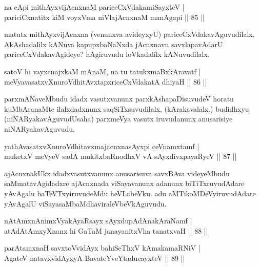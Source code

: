 \begin{shl}
na cApi mithAyxvijAcnxnaM pariceCxVdakamiSayxteV |\\
pariciCxnatitx kiM voyxVma niVlajAcnxnaM manAgapi \hfill || 85 ||
\end{shl}

\begin{artha}
matutx mithAyxvijAcnxna (venunxva avideyxyU) pariceCxVdakavAguvudilalx, AkAshadalilx 
kANuva kapupxbaNaNxda jAcnxnavu savxlapavAdarU pariceCxVdakavAgideye? hAgiruvudu loVkadalilx 
kANuvudilalx.
\end{artha}

\begin{shl}
satoV hi vayxcnajxkaM mAnaM, na tu tatukxmaBxkAravatf |\\
meVyavasatxvXnuroVdhitAvxtapxriceCxVdakatA dhiyaH \hfill || 86 ||
\end{shl}

\begin{artha}
parxmANaveMbudu idadx vasutxvanunx parxkAshapaDisuvudeV horatu kuMbAranaMte ilalxdadxnunx 
saqSiTxsuvudilalx, (kArakavalalx.) budidhxyu (niNARyakavAguvudUsaha) parxmeVya vasutx 
iruvudanunx anusarisiye niNARyakavAguvudu.
\end{artha}

\begin{shl}
yathAvasatxvXnuroVdhitavxmajacnxnasAyxpi ceVnamxtamf |\\
muketxV meVyeV sadA mukitxbaRnodhxV vA sAyxdivxpayaRyeV \hfill || 87 ||
\end{shl}

\begin{artha}
ajAcnxnakUkx idadxvasutxvanunx anusarisuva savxBAva videyeMbudu saMmatavAgidadxre ajAcnxnada viSayavanunx adanunx biTiTxruvudAdare yAvAgalu baTeVTxyiruvudeMdu heVLabeVku. adu aMTikoMDeVyiruvudAdare yAvAgalU viSayasaMbaMdhaviraleVbeVkAguvudu.
\end{artha}


\begin{shl}
nA\s \s tAmx\s nAnimxVyakAyaRsayx sAyxdupAdAnakAraNamf |\\
atAdAtAmxyXnanx hi GaTaM janayanitxVha tanatxvaH \hfill || 88 ||
\end{shl}

\begin{shl}
parAtamxnaH savxtoV\s vidAyx bahiSeThxV kAmakamaRNiV |\\
AgateV natavxvidAyxyA BavateYveYtaducayxteV \hfill || 89 ||
\end{shl}

